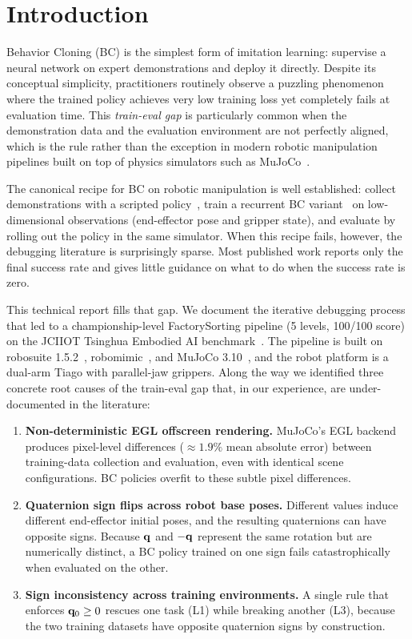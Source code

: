 \section{Introduction}
\label{sec:introduction}

Behavior Cloning (BC) is the simplest form of imitation learning: supervise a neural network on expert demonstrations and deploy it directly. Despite its conceptual simplicity, practitioners routinely observe a puzzling phenomenon where the trained policy achieves very low training loss yet completely fails at evaluation time. This \emph{train-eval gap} is particularly common when the demonstration data and the evaluation environment are not perfectly aligned, which is the rule rather than the exception in modern robotic manipulation pipelines built on top of physics simulators such as MuJoCo~\cite{todorov2012mujoco}.

The canonical recipe for BC on robotic manipulation is well established: collect demonstrations with a scripted policy~\cite{robosuite}, train a recurrent BC variant~\cite{robomimic} on low-dimensional observations (end-effector pose and gripper state), and evaluate by rolling out the policy in the same simulator. When this recipe fails, however, the debugging literature is surprisingly sparse. Most published work reports only the final success rate and gives little guidance on what to do when the success rate is zero.

This technical report fills that gap. We document the iterative debugging process that led to a championship-level FactorySorting pipeline (5 levels, 100/100 score) on the JCIIOT Tsinghua Embodied AI benchmark~\cite{jciiot2026}. The pipeline is built on robosuite 1.5.2~\cite{robosuite}, robomimic~\cite{robomimic}, and MuJoCo 3.10~\cite{todorov2012mujoco}, and the robot platform is a dual-arm Tiago with parallel-jaw grippers. Along the way we identified three concrete root causes of the train-eval gap that, in our experience, are under-documented in the literature:

\begin{enumerate}[leftmargin=*,itemsep=2pt]
    \item \textbf{Non-deterministic EGL offscreen rendering.} MuJoCo's EGL backend produces pixel-level differences ($\approx 1.9\%$ mean absolute error) between training-data collection and evaluation, even with identical scene configurations. BC policies overfit to these subtle pixel differences.
    \item \textbf{Quaternion sign flips across robot base poses.} Different  values induce different end-effector initial poses, and the resulting quaternions can have opposite signs. Because $\mathbf{q}$ and $-\mathbf{q}$ represent the same rotation but are numerically distinct, a BC policy trained on one sign fails catastrophically when evaluated on the other.
    \item \textbf{Sign inconsistency across training environments.} A single  rule that enforces $\mathbf{q}_0 \geq 0$ rescues one task (L1) while breaking another (L3), because the two training datasets have opposite quaternion signs by construction.
\end{enumerate}

